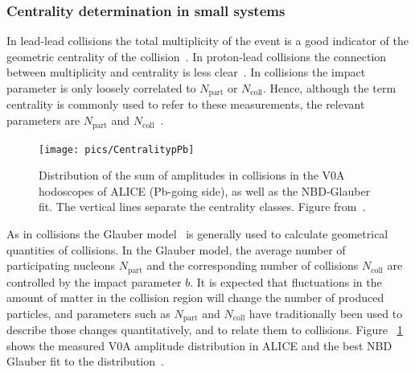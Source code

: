 \FloatBarrier
\subsubsection{Centrality determination in small systems}
\label{sec:smallsystemcentrality}
In lead-lead collisions the total multiplicity of the event is a good indicator of the geometric centrality of the collision~\cite{Abelev:2013qoq}. In proton-lead collisions the connection between multiplicity and centrality is less clear~\cite{Adam:2014qja}. In \pPb collisions the impact parameter is only loosely correlated to $N_\mathrm{part}$ or $N_\mathrm{coll}$. Hence, although the term centrality is commonly used to refer to these measurements, the relevant parameters are $N_\mathrm{part}$ and $N_\mathrm{coll}$~\cite{Adam:2014qja}.

\begin{figure}[b!]
\centering
            	\texttt{[image: pics/CentralitypPb]}
                \caption{Distribution of the sum of amplitudes in \pPb collisions in the V0A hodoscopes of ALICE (Pb-going side), as well
as the NBD-Glauber fit. The vertical lines separate the centrality classes. Figure from~\cite{Adam:2014qja}.}
	\label{fig:pPbcentrality}
\end{figure}




As in \PbPb collisions the Glauber model~\cite{Miller:2007ri} is generally used to calculate geometrical quantities of \pPb collisions. In the Glauber model, the average number of participating nucleons  $N_\mathrm{part}$ and the corresponding number of collisions $N_\mathrm{coll}$ are controlled by  the impact parameter $b$. It is expected that fluctuations in the amount of matter in the collision region will change the number of produced particles, and parameters such as $N_\mathrm{part}$ and $N_\mathrm{coll}$ have traditionally been used to describe those changes quantitatively, and to relate them to \pp collisions. Figure ~\ref{fig:pPbcentrality} shows the measured V0A amplitude distribution in ALICE and the best NBD Glauber fit to the distribution~\cite{Adam:2014qja}.




